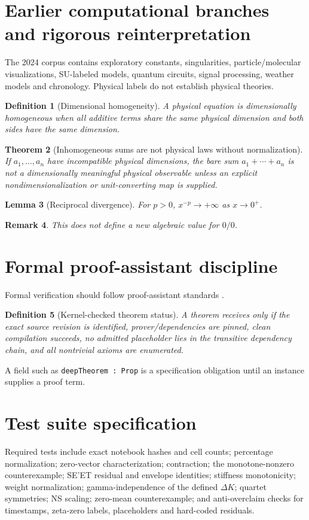 \documentclass[11pt]{article}
\newtheorem{theorem}{Theorem}[section]
\newtheorem{lemma}[theorem]{Lemma}
\newtheorem{definition}[theorem]{Definition}
\newtheorem{remark}[theorem]{Remark}
\newcommand{\Status}[1]{\texttt{\detokenize{#1}}}
\begin{document}
\section{Earlier computational branches and rigorous reinterpretation}
The 2024 corpus contains exploratory constants, singularities, particle/molecular visualizations, SU-labeled models, quantum circuits, signal processing, weather models and chronology. Physical labels do not establish physical theories.

\begin{definition}[Dimensional homogeneity]A physical equation is dimensionally homogeneous when all additive terms share the same physical dimension and both sides have the same dimension.\end{definition}
\begin{theorem}[Inhomogeneous sums are not physical laws without normalization]
If $a_1,\ldots,a_n$ have incompatible physical dimensions, the bare sum $a_1+\cdots+a_n$ is not a dimensionally meaningful physical observable unless an explicit nondimensionalization or unit-converting map is supplied.
\end{theorem}

\begin{lemma}[Reciprocal divergence]For $p>0$, $x^{-p}\to+\infty$ as $x\to0^+$.\end{lemma}
\begin{remark}This does not define a new algebraic value for $0/0$.\end{remark}

\section{Formal proof-assistant discipline}
Formal verification should follow proof-assistant standards \cite{Lean2015,IsabelleHOL2002,Norell2009}.
\begin{definition}[Kernel-checked theorem status]
A theorem receives \Status{FORMAL_PROOF_CHECKED} only if the exact source revision is identified, prover/dependencies are pinned, clean compilation succeeds, no admitted placeholder lies in the transitive dependency chain, and all nontrivial axioms are enumerated.
\end{definition}
A field such as \texttt{deepTheorem : Prop} is a specification obligation until an instance supplies a proof term.

\section{Test suite specification}
Required tests include exact notebook hashes and cell counts; percentage normalization; zero-vector characterization; contraction; the monotone-nonzero counterexample; SE'ET residual and envelope identities; stiffness monotonicity; weight normalization; gamma-independence of the defined $\Delta K$; quartet symmetries; NS scaling; zero-mean counterexample; and anti-overclaim checks for timestamps, zeta-zero labels, placeholders and hard-coded residuals.
\end{document}
